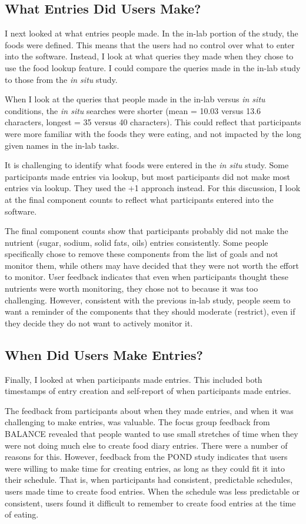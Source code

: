 \subsection{What Entries Did Users Make?}
I next looked at what entries people made. In the in-lab portion of the study, the foods were defined. This means that the users had no control over what to enter into the software. Instead, I look at what queries they made when they chose to use the food lookup feature. I could compare the queries made in the in-lab study to those from the \textit{in situ} study. 

When I look at the queries that people made in the in-lab versus \textit{in situ} conditions, the \textit{in situ} searches were shorter (mean = 10.03 versus 13.6 characters, longest = 35 versus 40 characters). This could reflect that participants were more familiar with the foods they were eating, and not impacted by the long given names in the in-lab tasks. 

It is challenging to identify what foods were entered in the \textit{in situ} study. Some participants made entries via lookup, but most participants did not make most entries via lookup. They used the +1 approach instead. For this discussion, I look at the final component counts to reflect what participants entered into the software. 

The final component counts show that participants probably did not make the nutrient (sugar, sodium, solid fats, oils) entries consistently. Some people specifically chose to remove these components from the list of goals and not monitor them, while others may have decided that they were not worth the effort to monitor. User feedback indicates that even when participants thought these nutrients were worth monitoring, they chose not to because it was too challenging. However, consistent with the previous in-lab study, people seem to want a reminder of the components that they should moderate (restrict), even if they decide they do not want to actively monitor it. 

\subsection{When Did Users Make Entries?}
Finally, I looked at when participants made entries. This included both timestamps of entry creation and self-report of when participants made entries. 

The feedback from participants about when they made entries, and when it was challenging to make entries, was valuable. The focus group feedback from BALANCE revealed that people wanted to use small stretches of time when they were not doing much else to create food diary entries. There were a number of reasons for this. However, feedback from the POND study indicates that users were willing to make time for creating entries, as long as they could fit it into their schedule. That is, when participants had consistent, predictable schedules, users made time to create food entries. When the schedule was less predictable or consistent, users found it difficult to remember to create food entries at the time of eating. 

